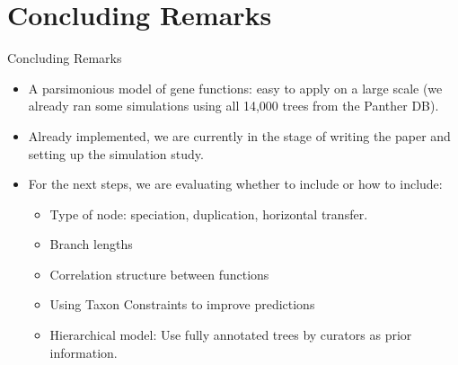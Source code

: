 \documentclass[9pt,handout,ignorenonframetext,]{beamer}
\begin{document}
\section{Concluding Remarks}\label{concluding-remarks}

\begin{frame}{Concluding Remarks}

\begin{itemize}
\item
  A parsimonious model of gene functions: easy to apply on a large scale
  (we already ran some simulations using all 14,000 trees from the
  Panther DB).\pause
\item
  Already implemented, we are currently in the stage of writing the
  paper and setting up the simulation study.\pause
\item
  For the next steps, we are evaluating whether to include or how to
  include:\pause

  \begin{itemize}
  \item
    Type of node: speciation, duplication, horizontal transfer.
  \item
    Branch lengths
  \item
    Correlation structure between functions
  \item
    Using Taxon Constraints to improve predictions
  \item
    Hierarchical model: Use fully annotated trees by curators as prior
    information.
  \end{itemize}
\end{itemize}

\end{frame}

\begin{frame}{}

\begin{center}
\Huge
{}
\end{center}

\maketitle

\appendix

\end{frame}
\end{document}

